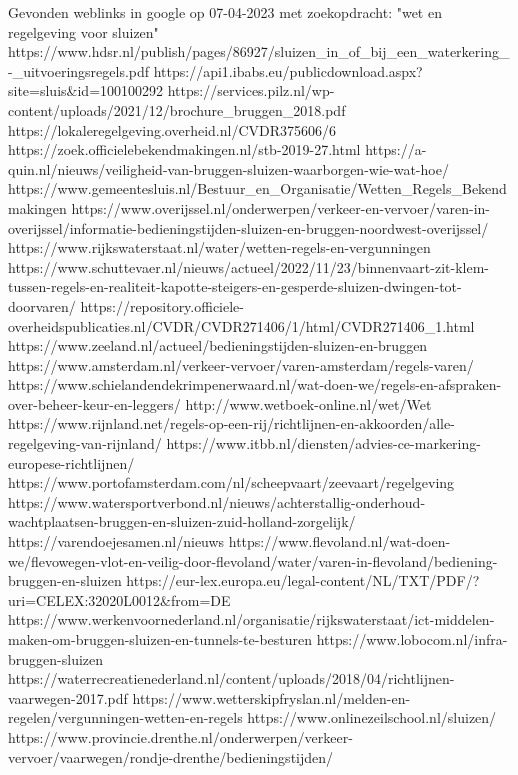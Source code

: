Gevonden weblinks in google op 07-04-2023 met zoekopdracht: "wet en regelgeving voor sluizen"
https://www.hdsr.nl/publish/pages/86927/sluizen_in_of_bij_een_waterkering_-_uitvoeringsregels.pdf
https://api1.ibabs.eu/publicdownload.aspx?site=sluis&id=100100292
https://services.pilz.nl/wp-content/uploads/2021/12/brochure_bruggen_2018.pdf
https://lokaleregelgeving.overheid.nl/CVDR375606/6
https://zoek.officielebekendmakingen.nl/stb-2019-27.html
https://a-quin.nl/nieuws/veiligheid-van-bruggen-sluizen-waarborgen-wie-wat-hoe/
https://www.gemeentesluis.nl/Bestuur_en_Organisatie/Wetten_Regels_Bekendmakingen
https://www.overijssel.nl/onderwerpen/verkeer-en-vervoer/varen-in-overijssel/informatie-bedieningstijden-sluizen-en-bruggen-noordwest-overijssel/
https://www.rijkswaterstaat.nl/water/wetten-regels-en-vergunningen
https://www.schuttevaer.nl/nieuws/actueel/2022/11/23/binnenvaart-zit-klem-tussen-regels-en-realiteit-kapotte-steigers-en-gesperde-sluizen-dwingen-tot-doorvaren/
https://repository.officiele-overheidspublicaties.nl/CVDR/CVDR271406/1/html/CVDR271406_1.html
https://www.zeeland.nl/actueel/bedieningstijden-sluizen-en-bruggen
https://www.amsterdam.nl/verkeer-vervoer/varen-amsterdam/regels-varen/
https://www.schielandendekrimpenerwaard.nl/wat-doen-we/regels-en-afspraken-over-beheer-keur-en-leggers/
http://www.wetboek-online.nl/wet/Wet%
https://www.rijnland.net/regels-op-een-rij/richtlijnen-en-akkoorden/alle-regelgeving-van-rijnland/
https://www.itbb.nl/diensten/advies-ce-markering-europese-richtlijnen/
https://www.portofamsterdam.com/nl/scheepvaart/zeevaart/regelgeving
https://www.watersportverbond.nl/nieuws/achterstallig-onderhoud-wachtplaatsen-bruggen-en-sluizen-zuid-holland-zorgelijk/
https://varendoejesamen.nl/nieuws
https://www.flevoland.nl/wat-doen-we/flevowegen-vlot-en-veilig-door-flevoland/water/varen-in-flevoland/bediening-bruggen-en-sluizen
https://eur-lex.europa.eu/legal-content/NL/TXT/PDF/?uri=CELEX:32020L0012&from=DE
https://www.werkenvoornederland.nl/organisatie/rijkswaterstaat/ict-middelen-maken-om-bruggen-sluizen-en-tunnels-te-besturen
https://www.lobocom.nl/infra-bruggen-sluizen
https://waterrecreatienederland.nl/content/uploads/2018/04/richtlijnen-vaarwegen-2017.pdf
https://www.wetterskipfryslan.nl/melden-en-regelen/vergunningen-wetten-en-regels
https://www.onlinezeilschool.nl/sluizen/
https://www.provincie.drenthe.nl/onderwerpen/verkeer-vervoer/vaarwegen/rondje-drenthe/bedieningstijden/




